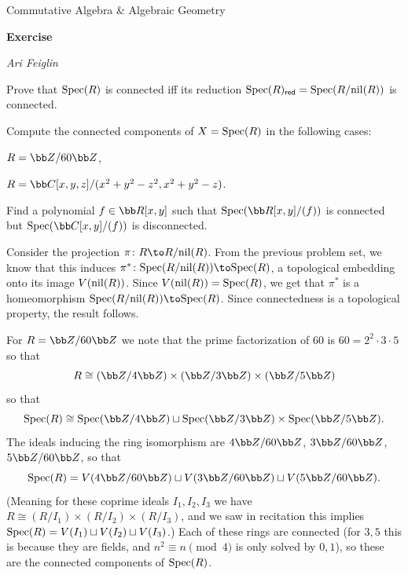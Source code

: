 


\def\enumindent{0cm}

\def\printmcount{\the\counter{section}.\the\counter{math counter}}
\setcounter{section}{3}

\centerline{Commutative Algebra \& Algebraic Geometry}
\medskip
\centerline{\bf Exercise \the{}}
\smallskip
\centerline{\it Ari Feiglin}

\def\red{{\sf red}}

\bprob

    \benum
        \item Prove that ${\rm Spec}(R)$ is connected iff its {\emphcolor reduction} $\spec(R)_\red=\spec(R/\nil(R))$ is connected.
        \item Compute the connected components of $X={\rm Spec}(R)$ in the following cases:
        \benum
            \item $R=\bZ/60\bZ$,
            \item $R=\bC[x,y,z]/(x^2+y^2-z^2,x^2+y^2-z)$.
        \eenum
        \item Find a polynomial $f\in\bR[x,y]$ such that $\spec(\bR[x,y]/(f))$ is connected but $\spec(\bC[x,y]/(f))$ is disconnected.
    \eenum

\eprob

\benum
    \item Consider the projection $\pi\colon R\to R/\nil(R)$.
    From the previous problem set, we know that this induces $\pi^*\colon\spec(R/\nil(R))\to\spec(R)$, a topological embedding onto its image $V({\rm nil}(R))$.
    Since $V({\rm nil}(R))={\rm Spec}(R)$, we get that $\pi^*$ is a homeomorphism $\spec(R/\nil(R))\to\spec(R)$.
    Since connectedness is a topological property, the result follows.

    \item
    \benum
        \item For $R=\bZ/60\bZ$ we note that the prime factorization of $60$ is $60=2^2\cdot3\cdot5$ so that
        $$ R \cong (\bZ/4\bZ) \times (\bZ/3\bZ) \times (\bZ/5\bZ) $$
        so that
        $$ \spec(R) \cong \spec(\bZ/4\bZ) \sqcup \spec(\bZ/3\bZ) \times \spec(\bZ/5\bZ) . $$
        The ideals inducing the ring isomorphism are $4\bZ/60\bZ$, $3\bZ/60\bZ$, $5\bZ/60\bZ$, so that
        $$ \spec(R) = V(4\bZ/60\bZ) \sqcup V(3\bZ/60\bZ) \sqcup V(5\bZ/60\bZ) . $$
        (Meaning for these coprime ideals $I_1,I_2,I_3$ we have $R\cong(R/I_1)\times(R/I_2)\times(R/I_3)$, and we saw in recitation this implies ${\rm Spec}(R)=V(I_1)\sqcup V(I_2)\sqcup V(I_3)$.)
        Each of these rings are connected (for $3,5$ this is because they are fields, and $n^2\equiv n\pmod4$ is only solved by $0,1$), so these are the connected components of ${\rm Spec}(R)$.

